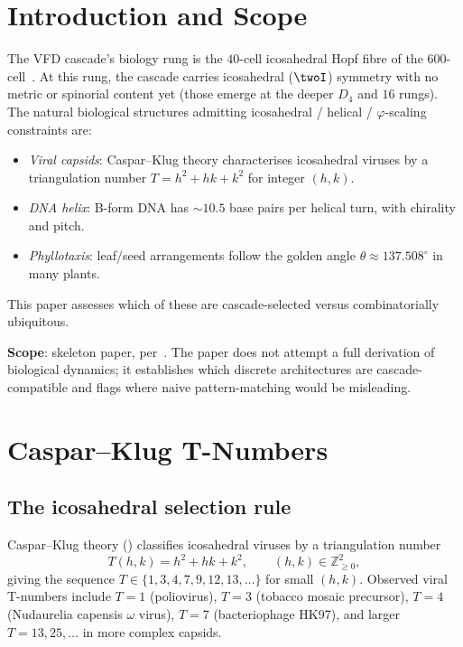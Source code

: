 \documentclass[12pt]{article}
\theoremstyle{definition}
\theoremstyle{remark}
\begin{document}
\section{Introduction and Scope}\label{sec:intro}

The VFD cascade's biology rung is the $40$-cell icosahedral Hopf fibre of the 600-cell~\citep{SmartXXXV, SmartXXXVI}. At this rung, the cascade carries icosahedral ($\twoI$) symmetry with no metric or spinorial content yet (those emerge at the deeper $D_4$ and $16$ rungs). The natural biological structures admitting icosahedral / helical / $\varphi$-scaling constraints are:
\begin{itemize}
\item \emph{Viral capsids}: Caspar--Klug theory characterises icosahedral viruses by a triangulation number $T = h^2 + hk + k^2$ for integer $(h, k)$.
\item \emph{DNA helix}: B-form DNA has $\sim 10.5$ base pairs per helical turn, with chirality and pitch.
\item \emph{Phyllotaxis}: leaf/seed arrangements follow the golden angle $\theta \approx 137.508^\circ$ in many plants.
\end{itemize}
This paper assesses which of these are cascade-selected versus combinatorially ubiquitous.

\textbf{Scope}: skeleton paper, per~\citep{WOP43}. The paper does not attempt a full derivation of biological dynamics; it establishes which discrete architectures are cascade-compatible and flags where naive pattern-matching would be misleading.

\section{Caspar--Klug T-Numbers}\label{sec:tnumbers}

\subsection{The icosahedral selection rule}

Caspar--Klug theory (\citep{CasparKlug1962}) classifies icosahedral viruses by a triangulation number
\begin{equation}\label{eq:CK-Tnumber}
T(h, k) = h^2 + hk + k^2, \qquad (h, k) \in \mathbb{Z}_{\ge 0}^2,
\end{equation}
giving the sequence $T \in \{1, 3, 4, 7, 9, 12, 13, \ldots\}$ for small $(h, k)$. Observed viral T-numbers include $T = 1$ (poliovirus), $T = 3$ (tobacco mosaic precursor), $T = 4$ (Nudaurelia capensis $\omega$ virus), $T = 7$ (bacteriophage HK97), and larger $T = 13, 25, \ldots$ in more complex capsids.
\end{document}

